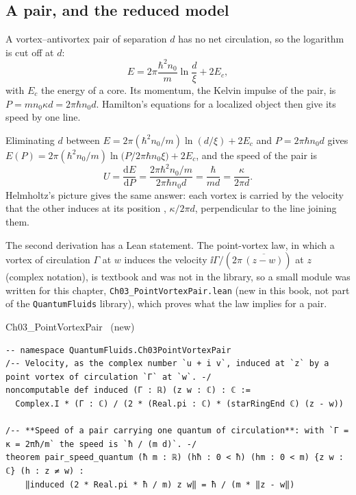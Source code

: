 \subsection{A pair, and the reduced model}\label{ch03:pair}A vortex--antivortex pair of separation $d$ has no net circulation, so the logarithm is cut off at $d$:
\begin{equation}\label{ch03:eq-pairE}
  E=2\pi\frac{\hbar^2n_0}{m}\ln\frac d\xi+2E_c ,
\end{equation}
with $E_c$ the energy of a core. Its momentum, the Kelvin impulse of the pair, is $P=mn_0\kappa d=2\pi\hbar n_0d$. Hamilton's equations for a localized object then give its speed by one line.

\begin{keybox}
Eliminating $d$ between $E=2\pi(\hbar^2n_0/m)\ln(d/\xi)+2E_c$ and $P=2\pi\hbar n_0d$ gives $E(P)=2\pi(\hbar^2n_0/m)\ln\!\big(P/2\pi\hbar n_0\xi\big)+2E_c$, and the speed of the pair is
\[
  U=\frac{\mathrm dE}{\mathrm dP}=\frac{2\pi\hbar^2n_0/m}{2\pi\hbar n_0d}=\frac{\hbar}{md}=\frac{\kappa}{2\pi d}.
\]
Helmholtz's picture gives the same answer: each vortex is carried by the velocity that the other induces at its position \cite{Helmholtz1858}, $\kappa/2\pi d$, perpendicular to the line joining them.
\end{keybox}

The second derivation has a Lean statement. The point-vortex law, in which a vortex of circulation $\Gamma$ at $w$ induces the velocity $\ii\Gamma/(2\pi\,\overline{(z-w)})$ at $z$ (complex notation), is textbook and was not in the library, so a small module was written for this chapter, \texttt{Ch03\_PointVortexPair.lean} (new in this book, not part of the \texttt{QuantumFluids} library), which proves what the law implies for a pair.

\begin{leanbox}{Ch03\_PointVortexPair \ (new)}
\begin{lstlisting}[style=lean,basicstyle=\ttfamily\footnotesize]
-- namespace QuantumFluids.Ch03PointVortexPair
/-- Velocity, as the complex number `u + i v`, induced at `z` by a point vortex of circulation `Γ` at `w`. -/
noncomputable def induced (Γ : ℝ) (z w : ℂ) : ℂ :=
  Complex.I * (Γ : ℂ) / (2 * (Real.pi : ℂ) * (starRingEnd ℂ) (z - w))

/-- **Speed of a pair carrying one quantum of circulation**: with `Γ = κ = 2πħ/m` the speed is `ħ / (m d)`. -/
theorem pair_speed_quantum (ħ m : ℝ) (hħ : 0 < ħ) (hm : 0 < m) {z w : ℂ} (h : z ≠ w) :
    ‖induced (2 * Real.pi * ħ / m) z w‖ = ħ / (m * ‖z - w‖)
\end{lstlisting}
\end{leanbox}

